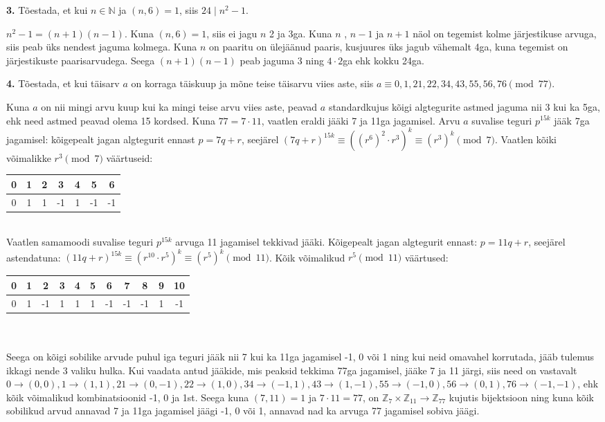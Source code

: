 \documentclass[a4paper, 10pt]{article}
\newcommand{\Z}{\mathbb{Z}}
\newcommand{\N}{\mathbb{N}}
\begin{document}
\bigskip

\noindent \textbf{3.} Tõestada, et kui $n\in\N$ ja $(n,6)=1$, siis $24\mid n^2-1$.

\bigskip
$n^2-1=(n+1)(n-1)$. Kuna  $(n,6)=1$, siis ei jagu $n$ 2 ja 3ga. Kuna $n$ , $n-1$ ja $n+1$ näol on tegemist kolme järjestikuse arvuga, siis peab üks nendest jaguma kolmega. Kuna $n$ on paaritu on ülejäänud paaris, kusjuures üks jagub vähemalt 4ga, kuna tegemist on järjestikuste paarisarvudega. Seega $(n+1)(n-1)$ peab jaguma 3 ning $4\cdot 2$ga ehk kokku 24ga.
\bigskip
\pagebreak

\noindent \textbf{4.} Tõestada, et kui täisarv $a$ on korraga täiskuup ja mõne teise täisarvu viies
aste, siis $a\equiv 0,1,21,22,34,43,55,56,76\pmod{77}$.

\bigskip

Kuna $a$ on nii mingi arvu kuup kui ka mingi teise arvu viies aste, peavad $a$ standardkujus kõigi algtegurite astmed jaguma nii 3 kui ka 5ga, ehk need astmed peavad olema 15 kordsed. Kuna $77=7\cdot11$, vaatlen eraldi jääki 7 ja 11ga jagamisel. Arvu $a$ suvalise teguri $p^{15k}$ jääk 7ga jagamisel: kõigepealt jagan algtegurit ennast $p=7q+r$, seejärel $(7q+r)^{15k}\equiv ((r^{6})^2\cdot r^3)^k\equiv(r^3)^k \pmod 7$. Vaatlen kõiki võimalikke $r^{3}\pmod7$ väärtuseid: 
\begin{tabular}{c|c|c|c|c|c|c}
0&1&2&3&4&5&6\\
\hline
0&1&1&-1&1&-1&-1
\end{tabular}\\
Vaatlen samamoodi suvalise teguri $p^{15k}$ arvuga 11 jagamisel tekkivad jääki. Kõigepealt jagan algtegurit ennast: $p=11q+r$, seejärel astendatuna: $(11q+r)^{15k}\equiv (r^{10}\cdot r^5)^k\equiv(r^5)^k \pmod {11}$. Kõik võimalikud $r^5\pmod {11}$ väärtused:

\begin{tabular}{c|c|c|c|c|c|c|c|c|c|c}
0&1&2&3&4&5&6&7&8&9&10\\
\hline
0&1&-1&1&1&1&-1&-1&-1&1&-1
\end{tabular}\\
\bigskip\\
Seega on kõigi sobilike arvude puhul iga teguri jääk nii 7 kui ka 11ga jagamisel -1, 0 või 1 ning kui neid omavahel korrutada, jääb tulemus ikkagi nende 3 valiku hulka. Kui vaadata antud jääkide, mis peaksid tekkima 77ga jagamisel, jääke 7 ja 11 järgi, siis need on vastavalt $0\to(0,0), 1\to(1,1), 21\to(0,-1), 22\to(1,0), 34\to(-1,1), 43\to(1,-1), 55\to(-1,0), 56\to(0,1), 76\to(-1,-1)$, ehk kõik võimalikud kombinatsioonid -1, 0 ja 1st. Seega kuna $(7,11)=1$ ja $7\cdot11=77$, on $\Z_7\times \Z_{11}\to \Z_{77}$ kujutis bijektsioon ning kuna kõik sobilikud arvud annavad 7 ja 11ga jagamisel jäägi -1, 0 või 1, annavad nad ka arvuga 77 jagamisel sobiva jäägi.
\end{document}
